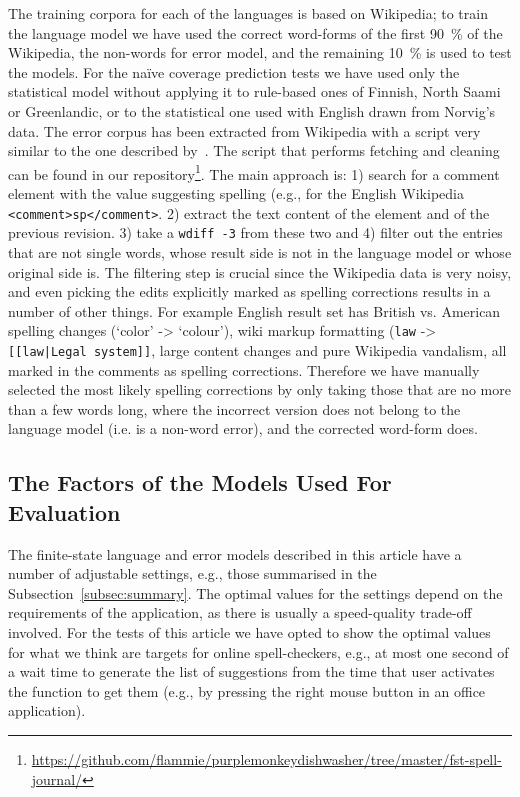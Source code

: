 \documentclass[a4paper,12pt]{article}
\begin{document}
The training corpora for each of the languages is based on Wikipedia; to train
the language model we have used the correct word-forms of the first 90~\% of
the Wikipedia, the non-words for error model, and the remaining 10~\% is used
to test the models. For the naïve coverage prediction tests we have used only
the statistical model without applying it to rule-based ones of Finnish, North
Saami or Greenlandic, or to the statistical one used with English drawn from
Norvig's data. The error corpus has been extracted from Wikipedia
with a script very similar to the one described by~\cite{max2010mining}. The
script that performs fetching and cleaning can be found in our
repository\footnote{\url{https://github.com/flammie/purplemonkeydishwasher/tree/master/fst-spell-journal/}}. The main approach is: 1) search for a comment
element with the value suggesting spelling (e.g., for the English Wikipedia
\texttt{<comment>sp</comment>}. 2) extract the text content of the element and
of the previous revision. 3) take a \texttt{wdiff -3} from these two and 4)
filter out the entries that are not single words, whose result side is not in
the language model or whose original side is.  The filtering step is crucial
since the Wikipedia data is very noisy, and even picking the edits explicitly
marked as spelling corrections results in a number of other things. For example
English result set has British vs.  American spelling changes (`color' ->
`colour'), wiki markup formatting (\texttt{law} -> \texttt{[[law|Legal
system]]}, large content changes and pure Wikipedia vandalism, all marked in
the comments as spelling corrections. Therefore we have manually selected the
most likely spelling corrections by only taking those that are no more than a
few words long, where the incorrect version does not belong to the language
model (i.e.  is a non-word error), and the corrected word-form does.

\subsection{The Factors of the Models Used For Evaluation}
\label{subsec:factors}

The finite-state language and error models described in this article have a
number of adjustable settings, e.g., those summarised in the
Subsection~\ref{subsec:summary}. The optimal values for the settings depend on
the requirements of the application, as there is usually a speed-quality
trade-off involved. For the tests of this article we have opted to show the
optimal values for what we think are targets for online spell-checkers, e.g., at
most one second of a wait time to generate the list of suggestions from the
time that user activates the function to get them (e.g., by pressing the right
mouse button in an office application).
\end{document}
